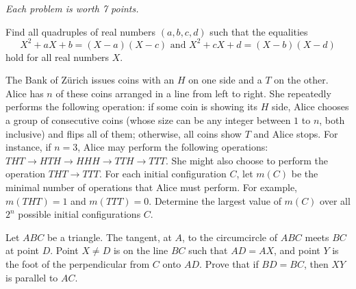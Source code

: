 \documentclass{qmo}
\date{May 9th, 2020}
\begin{document}
\maketitle
\begin{flushright}
    \emph{Each problem is worth 7 points.}
\end{flushright}
\begin{problem}
    Find all quadruples of real numbers $(a,b,c,d)$ such that the equalities 
    $$X^2 + a X + b = (X-a)(X-c) \mathrm{\,\,and\,\,} X^2 + c X + d = (X-b)(X-d)$$
    hold for all real numbers $X$.
\end{problem}

\begin{problem}
    The Bank of Z{\"u}rich issues coins with an $H$ on one side and a $T$ on the other. Alice has $n$ of these coins arranged in a line from left to right. She repeatedly performs the following operation: if some coin is showing its $H$ side, Alice chooses a group of consecutive coins (whose size can be any integer between $1$ to $n$, both inclusive) and flips all of them; otherwise, all coins show $T$ and Alice stops. For instance, if $n = 3$, Alice may perform the following operations: $THT \to HTH \to HHH \to TTH \to TTT$. She might also choose to perform the operation $THT \to TTT$.\nl
    For each initial configuration $C$, let $m(C)$ be the minimal number of operations that Alice must perform. For example, $m(THT) = 1$ and $m(TTT) = 0$. Determine the largest value of $m(C)$ over all $2^n$ possible initial configurations $C$.
\end{problem}

\begin{problem}
    Let $ABC$ be a triangle. The tangent, at $A$, to the circumcircle of $ABC$ meets $BC$ at point $D$. Point $X \ne D$ is on the line $BC$ such that $AD = AX$, and point $Y$ is the foot of the perpendicular from $C$ onto $AD$. Prove that if $BD = BC$, then $XY$ is parallel to $AC$.
\end{problem}

\newpage
\end{document}
